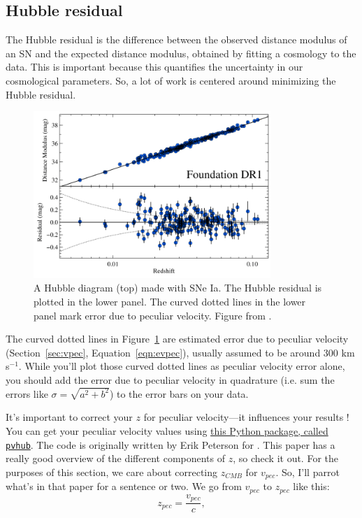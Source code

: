 \subsection{Hubble residual}
The Hubble residual is the difference between the observed distance modulus of an SN and the expected distance modulus, obtained by fitting a cosmology to the data. This is important because this quantifies the uncertainty in our cosmological parameters. So, a lot of work is centered around minimizing the Hubble residual. 

\begin{figure}[h!]
    \centering
    \includegraphics[width=0.8\textwidth]{figs/hubble-resid.png}
    \caption{A Hubble diagram (top) made with SNe Ia. The Hubble residual is plotted in the lower panel. The curved dotted lines in the lower panel mark error due to peculiar velocity. Figure from \cite{Foley2017}.}
    \label{fig:hresid}
\end{figure}

The curved dotted lines in Figure~\ref{fig:hresid} are estimated error due to peculiar velocity (Section~\ref{sec:vpec}, Equation~\ref{eqn:evpec}), usually assumed to be around 300 km s$^{-1}$. While you'll plot those curved dotted lines as peculiar velocity error alone, you should add the error due to peculiar velocity in quadrature (i.e. sum the errors like $\sigma = \sqrt{a^{2} + b^{2}}$) to the error bars on your data.

It's important to correct your $z$ for peculiar velocity---it influences your results \cite{Peterson2022}! You can get your peculiar velocity values using \href{https://github.com/laldoroty/pvhub/tree/make_installable}{this Python package, called \texttt{pvhub}}. The code is originally written by Erik Peterson for \cite{Peterson2022}. This paper has a really good overview of the different components of $z$, so check it out. For the purposes of this section, we care about correcting $z_{CMB}$ for $v_{pec}$. So, I'll parrot what's in that paper for a sentence or two. We go from $v_{pec}$ to $z_{pec}$ like this:
\begin{equation}
    z_{pec} = \frac{v_{pec}}{c},
\end{equation}


